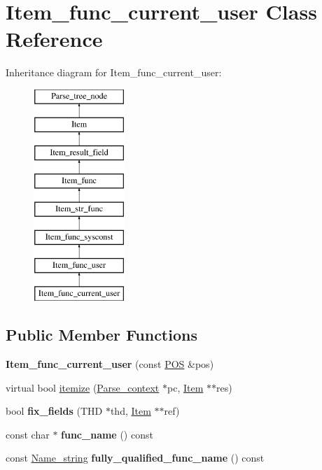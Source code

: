 \hypertarget{classItem__func__current__user}{}\section{Item\+\_\+func\+\_\+current\+\_\+user Class Reference}
\label{classItem__func__current__user}
Inheritance diagram for Item\+\_\+func\+\_\+current\+\_\+user\+:\begin{figure}[H]
\begin{center}
\leavevmode
\includegraphics[height=8.000000cm]{classItem__func__current__user}
\end{center}
\end{figure}
\subsection*{Public Member Functions}
\begin{DoxyCompactItemize}
\item 
\mbox{\label{classItem__func__current__user_a342e3e9862fb6f8ed9558470948e3de2}} 
{\bfseries Item\+\_\+func\+\_\+current\+\_\+user} (const \mbox{\hyperlink{structYYLTYPE}{P\+OS}} \&pos)
\item 
virtual bool \mbox{\hyperlink{classItem__func__current__user_a01674014623f5a365c7c42ff2db6fd80}{itemize}} (\mbox{\hyperlink{structParse__context}{Parse\+\_\+context}} $\ast$pc, \mbox{\hyperlink{classItem}{Item}} $\ast$$\ast$res)
\item 
\mbox{\label{classItem__func__current__user_a0af4f36d56cfe3c839ab0eb4febef1ec}} 
bool {\bfseries fix\+\_\+fields} (T\+HD $\ast$thd, \mbox{\hyperlink{classItem}{Item}} $\ast$$\ast$ref)
\item 
\mbox{\label{classItem__func__current__user_a95a6b8e9e65982edb2e76da6f5a33b72}} 
const char $\ast$ {\bfseries func\+\_\+name} () const
\item 
\mbox{\label{classItem__func__current__user_aa157a0437662c229fa15fd1dab4e5a18}} 
const \mbox{\hyperlink{className__string}{Name\+\_\+string}} {\bfseries fully\+\_\+qualified\+\_\+func\+\_\+name} () const
\end{DoxyCompactItemize}
